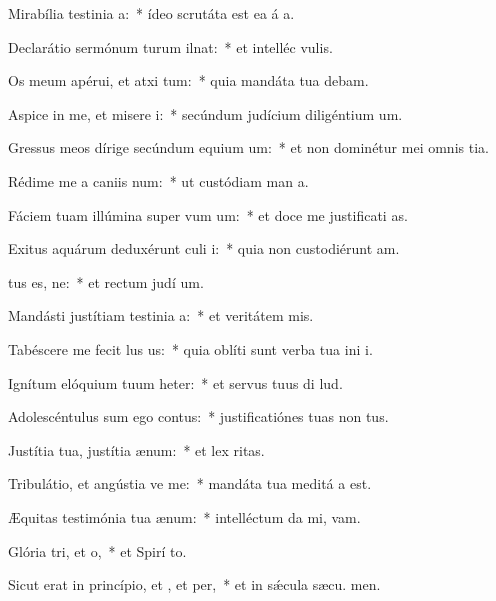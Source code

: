 \item Mirabília testinia a:~* ídeo scrutáta est ea á a.
\item Declarátio sermónum turum ilnat:~* et intelléc  vulis.
\item Os meum apérui, et atxi tum:~* quia mandáta tua debam.
\item Aspice in me, et misere i:~* secúndum judícium diligéntium  um.
\item Gressus meos dírige secúndum equium um:~* et non dominétur mei omnis tia.
\item Rédime me a caniis num:~* ut custódiam man a.
\item Fáciem tuam illúmina super vum um:~* et doce me justificati as.
\item Exitus aquárum deduxérunt culi i:~* quia non custodiérunt  am.
\item {}tus es, ne:~* et rectum judí um.
\item Mandásti justítiam testinia a:~* et veritátem  mis.
\item Tabéscere me fecit lus us:~* quia oblíti sunt verba tua ini i.
\item Ignítum elóquium tuum heter:~* et servus tuus di lud.
\item Adolescéntulus sum ego  contus:~* justificatiónes tuas non  tus.
\item Justítia tua, justítia  ænum:~* et lex  ritas.
\item Tribulátio, et angústia ve me:~* mandáta tua meditá a est.
\item Æquitas testimónia tua  ænum:~* intelléctum da mi,  vam.
\item Glória tri, et o,~* et Spirí to.
\item Sicut erat in princípio, et , et per,~* et in sǽcula sæcu. men.

